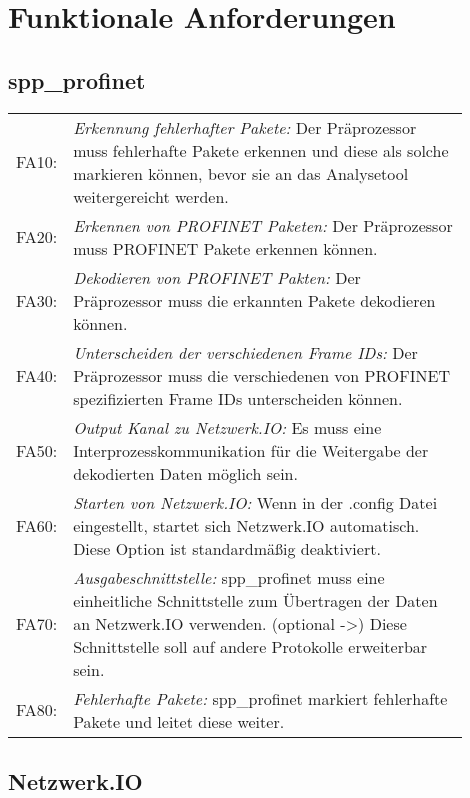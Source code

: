 \chapter{Funktionale Anforderungen}

\renewcommand{\arraystretch}{2}
\section{spp\_profinet}
\begin{tabular}{lp{0.9\linewidth}}

FA10: & \textit{Erkennung fehlerhafter Pakete: }Der Präprozessor muss fehlerhafte Pakete erkennen und diese als solche markieren können, bevor sie an das Analysetool weitergereicht werden. \\

FA20: & \textit{Erkennen von PROFINET Paketen: }Der Präprozessor muss PROFINET Pakete erkennen können. \\

FA30: & \textit{Dekodieren von PROFINET Pakten: }Der Präprozessor muss die erkannten Pakete dekodieren können. \\

FA40: & \textit{Unterscheiden der verschiedenen Frame IDs: }Der Präprozessor muss die verschiedenen von PROFINET spezifizierten Frame IDs unterscheiden können.\\

FA50: & \textit{Output Kanal zu Netzwerk.IO: }Es muss eine Interprozesskommunikation für die Weitergabe der dekodierten Daten möglich sein.\\

FA60: & \textit{Starten von Netzwerk.IO: }Wenn in der .config Datei eingestellt, startet sich Netzwerk.IO automatisch. Diese Option ist standardmäßig deaktiviert.\\

FA70: & \textit{Ausgabeschnittstelle: }spp\_profinet muss eine einheitliche Schnittstelle zum Übertragen der Daten an Netzwerk.IO verwenden. (optional ->) Diese Schnittstelle soll auf andere Protokolle erweiterbar sein.\\

FA80: & \textit{Fehlerhafte Pakete: }spp\_profinet markiert fehlerhafte Pakete und leitet diese weiter. \\

\end{tabular}

\section{Netzwerk.IO}
